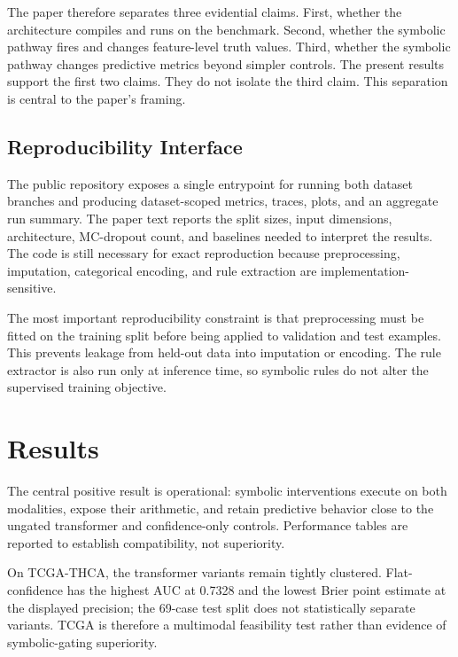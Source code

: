 \documentclass[final]{nesy2026}
\begin{document}
The paper therefore separates three evidential claims. First, whether the architecture compiles and runs on the benchmark. Second, whether the symbolic pathway fires and changes feature-level truth values. Third, whether the symbolic pathway changes predictive metrics beyond simpler controls. The present results support the first two claims. They do not isolate the third claim. This separation is central to the paper's framing.

\subsection{Reproducibility Interface}

The public repository exposes a single entrypoint for running both dataset branches and producing dataset-scoped metrics, traces, plots, and an aggregate run summary. The paper text reports the split sizes, input dimensions, architecture, MC-dropout count, and baselines needed to interpret the results. The code is still necessary for exact reproduction because preprocessing, imputation, categorical encoding, and rule extraction are implementation-sensitive.

The most important reproducibility constraint is that preprocessing must be fitted on the training split before being applied to validation and test examples. This prevents leakage from held-out data into imputation or encoding. The rule extractor is also run only at inference time, so symbolic rules do not alter the supervised training objective.

\section{Results}
\label{sec:results}

The central positive result is operational: symbolic interventions execute on both modalities, expose their arithmetic, and retain predictive behavior close to the ungated transformer and confidence-only controls. Performance tables are reported to establish compatibility, not superiority.

On TCGA-THCA, the transformer variants remain tightly clustered. Flat-confidence has the highest AUC at 0.7328 and the lowest Brier point estimate at the displayed precision; the 69-case test split does not statistically separate variants. TCGA is therefore a multimodal feasibility test rather than evidence of symbolic-gating superiority.
\end{document}
